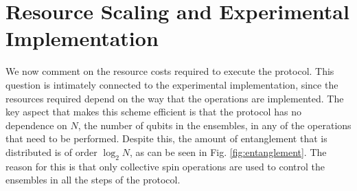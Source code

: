 \documentclass[12pt]{iopart}
\begin{document}










\section{Resource Scaling and Experimental Implementation}

We now comment on the resource costs required to execute the protocol.  This question is intimately connected to the experimental implementation, since the resources required depend on the way that the operations are implemented. 
The key aspect that makes this scheme efficient is that the protocol has no dependence on $ N $, the number of qubits in the ensembles, in any of the operations that need to be performed.  Despite this, the amount of entanglement that is distributed is of order $ \log_2 N $, as can be seen in Fig. \ref{fig:entanglement}.  The reason for this is that only collective spin operations are used to control the ensembles in all the steps of the protocol. 
\end{document}
